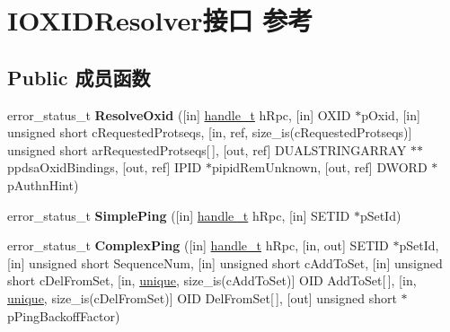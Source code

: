 \hypertarget{interface_i_o_x_i_d_resolver}{}\section{I\+O\+X\+I\+D\+Resolver接口 参考}
\label{interface_i_o_x_i_d_resolver}
\subsection*{Public 成员函数}
\begin{DoxyCompactItemize}
\item 
\mbox{\label{interface_i_o_x_i_d_resolver_a2747f634534759aa4f774770555d5eb3}} 
error\+\_\+status\+\_\+t {\bfseries Resolve\+Oxid} (\mbox{[}in\mbox{]} \hyperlink{interfacevoid}{handle\+\_\+t} h\+Rpc, \mbox{[}in\mbox{]} O\+X\+ID $\ast$p\+Oxid, \mbox{[}in\mbox{]} unsigned short c\+Requested\+Protseqs, \mbox{[}in, ref, size\+\_\+is(c\+Requested\+Protseqs)\mbox{]} unsigned short ar\+Requested\+Protseqs\mbox{[}$\,$\mbox{]}, \mbox{[}out, ref\mbox{]} D\+U\+A\+L\+S\+T\+R\+I\+N\+G\+A\+R\+R\+AY $\ast$$\ast$ppdsa\+Oxid\+Bindings, \mbox{[}out, ref\mbox{]} I\+P\+ID $\ast$pipid\+Rem\+Unknown, \mbox{[}out, ref\mbox{]} D\+W\+O\+RD $\ast$p\+Authn\+Hint)
\item 
\mbox{\label{interface_i_o_x_i_d_resolver_a0560adcc6cc2b1a48d2d7640b0d82fff}} 
error\+\_\+status\+\_\+t {\bfseries Simple\+Ping} (\mbox{[}in\mbox{]} \hyperlink{interfacevoid}{handle\+\_\+t} h\+Rpc, \mbox{[}in\mbox{]} S\+E\+T\+ID $\ast$p\+Set\+Id)
\item 
\mbox{\label{interface_i_o_x_i_d_resolver_ae300aff219e2ad6e525233a7a4d07541}} 
error\+\_\+status\+\_\+t {\bfseries Complex\+Ping} (\mbox{[}in\mbox{]} \hyperlink{interfacevoid}{handle\+\_\+t} h\+Rpc, \mbox{[}in, out\mbox{]} S\+E\+T\+ID $\ast$p\+Set\+Id, \mbox{[}in\mbox{]} unsigned short Sequence\+Num, \mbox{[}in\mbox{]} unsigned short c\+Add\+To\+Set, \mbox{[}in\mbox{]} unsigned short c\+Del\+From\+Set, \mbox{[}in, \hyperlink{interfaceunique}{unique}, size\+\_\+is(c\+Add\+To\+Set)\mbox{]} O\+ID Add\+To\+Set\mbox{[}$\,$\mbox{]}, \mbox{[}in, \hyperlink{interfaceunique}{unique}, size\+\_\+is(c\+Del\+From\+Set)\mbox{]} O\+ID Del\+From\+Set\mbox{[}$\,$\mbox{]}, \mbox{[}out\mbox{]} unsigned short $\ast$p\+Ping\+Backoff\+Factor)
\item 
$$
\end{DoxyCompactItemize}
